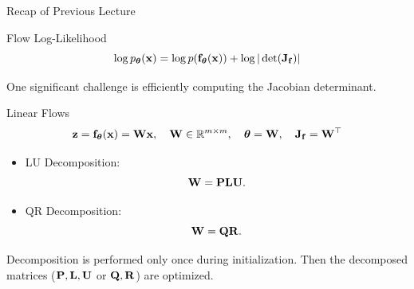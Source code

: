 \documentclass{beamer}
\begin{document}
\begin{frame}{Recap of Previous Lecture}
	\vspace{-0.5cm}
	\begin{block}{Flow Log-Likelihood}
		\vspace{-0.3cm}
		\[
			\log p_{\boldsymbol{\theta}}(\mathbf{x}) = \log p(\mathbf{f}_{\boldsymbol{\theta}}(\mathbf{x})) + \log |\det (\mathbf{J}_{\mathbf{f}})|
		\]
		\vspace{-0.5cm}
	\end{block}
	One significant challenge is efficiently computing the Jacobian determinant.
	\begin{block}{Linear Flows}	
		\vspace{-0.2cm}
		\[
			\mathbf{z} = \mathbf{f}_{\boldsymbol{\theta}}(\mathbf{x}) = \mathbf{W} \mathbf{x}, \quad \mathbf{W} \in \mathbb{R}^{m \times m}, \quad \boldsymbol{\theta} = \mathbf{W}, \quad \mathbf{J}_{\mathbf{f}} = \mathbf{W}^\top
		\]
	\end{block}
	\vspace{-0.3cm}
	\begin{itemize}
		\item LU Decomposition:
		\[
			\mathbf{W} = \mathbf{P} \mathbf{L} \mathbf{U}.
		\]
		\item QR Decomposition:
		\[
			\mathbf{W} = \mathbf{Q} \mathbf{R}.
		\]
	\end{itemize}
	Decomposition is performed only once during initialization. Then the decomposed matrices ($\mathbf{P}, \mathbf{L}, \mathbf{U}$ or $\mathbf{Q}, \mathbf{R}$) are optimized.
\end{frame}
\end{document}
